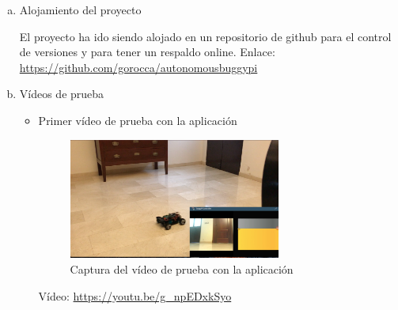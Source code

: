 \documentclass{pclass}
\begin{document}
	
	
	 
	







\begin{enumerate}[a)]
	\item Alojamiento del proyecto
	
		El proyecto ha ido siendo alojado en un repositorio de github para el control de versiones y para tener un respaldo online. Enlace: \url{https://github.com/gorocca/autonomousbuggypi}
	
	\item Vídeos de prueba
		\begin{itemize}
			\item Primer vídeo de prueba con la aplicación
				\begin{figure}[H]
					\centering
					\includegraphics[width=0.7\textwidth]{img/capturaPrimerVideoApp}
					\caption{Captura del vídeo de prueba con la aplicación}
					\label{fig:capturaPrimerVideoApp}
				\end{figure}
		
				 Vídeo: \url{https://youtu.be/g_npEDxkSyo}
				
		\end{itemize}

\end{enumerate}
\end{document}
